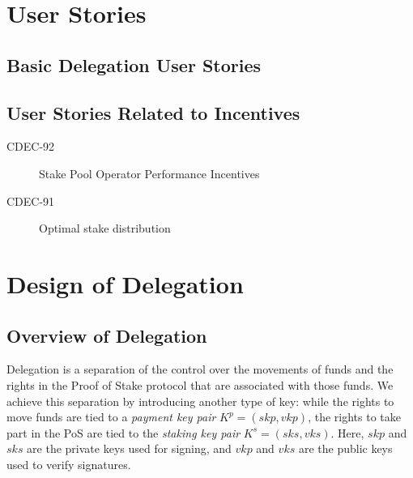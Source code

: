 \documentclass[11pt,a4paper]{article}
\begin{document}
\section{User Stories}
\label{user-stories}

\subsection{Basic Delegation User Stories}
\label{basic-delegation-user-stories}


\subsection{User Stories Related to Incentives}
\label{user-stories-related-to-incentives}

\begin{description}
\item[CDEC-92] Stake Pool Operator Performance Incentives
\item[CDEC-91] Optimal stake distribution
\end{description}


\section{Design of Delegation}
\label{design-of-delegation}

\newcommand{\hash}[1]{\mathcal{H}(#1)}

\subsection{Overview of Delegation}
\label{overview-of-delegation}

Delegation is a separation of the control over the movements of funds
and the rights in the Proof of Stake protocol that are associated with
those funds. We achieve this separation by introducing another type of
key: while the rights to move funds are tied to a \emph{payment key
pair} \(K^p=(skp, vkp)\), the rights to take part in the PoS are tied to
the \emph{staking key pair} \(K^s=(sks, vks)\). Here, \(skp\) and
\(sks\) are the private keys used for signing, and \(vkp\) and \(vks\)
are the public keys used to verify signatures.
\end{document}
